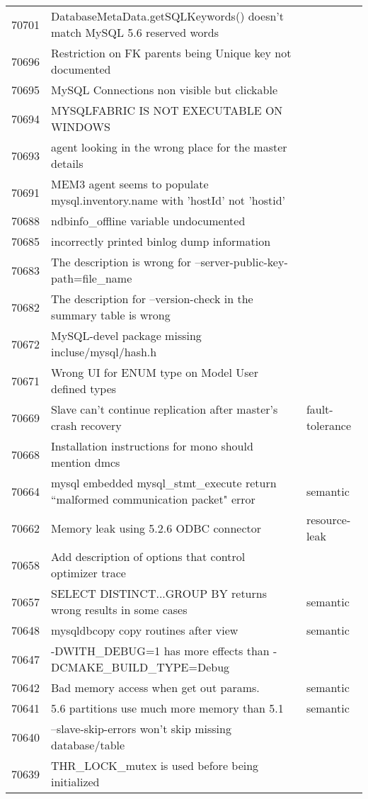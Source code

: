 \begin{longtable}[c]{p{1cm}p{10cm}p{1cm}}
70701 & DatabaseMetaData.getSQLKeywords() doesn't match MySQL 5.6 reserved words &  \\
70696 & Restriction on FK parents being Unique key not documented &  \\
70695 & MySQL Connections non visible but clickable &  \\
70694 & MYSQLFABRIC IS NOT EXECUTABLE ON WINDOWS &  \\
70693 & agent looking in the wrong place for the master details &  \\
70691 & MEM3 agent seems to populate mysql.inventory.name with 'hostId' not 'hostid' &  \\
70688 & ndbinfo\_offline variable undocumented &  \\
70685 & incorrectly printed binlog dump information &  \\
70683 & The description is wrong for --server-public-key-path=file\_name &  \\
70682 & The description for --version-check in the summary table is wrong &  \\
70672 & MySQL-devel package missing incluse/mysql/hash.h &  \\
70671 & Wrong UI for ENUM type on Model  User defined types &  \\
70669 & Slave can't continue replication after master's crash recovery & fault-tolerance \\
70668 & Installation instructions for mono should mention dmcs &  \\
70664 & mysql embedded mysql\_stmt\_execute return ``malformed communication packet" error & semantic \\
70662 & Memory leak using 5.2.6 ODBC connector & resource-leak \\
70658 & Add description of options that control optimizer trace & \\
70657 & SELECT DISTINCT...GROUP BY returns wrong results in some cases & semantic \\
70648 & mysqldbcopy copy routines after view & semantic \\
70647 & -DWITH\_DEBUG=1 has more effects than -DCMAKE\_BUILD\_TYPE=Debug &  \\
70642 & Bad memory access when get out params. & semantic \\
70641 & 5.6 partitions use much more memory than 5.1 & semantic \\
70640 & --slave-skip-errors won't skip missing database/table &  \\
70639 & THR\_LOCK\_mutex is used before being initialized &  \\

\end{longtable}
